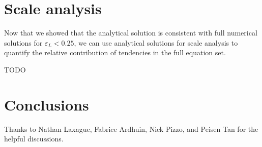 \documentclass[draft]{agujournal2019}
\begin{document}
\section{Scale analysis}
\label{section:scale_analysis}

Now that we showed that the analytical solution is consistent with full numerical
solutions for $\varepsilon_L < 0.25$, we can use analytical solutions for scale
analysis to quantify the relative contribution of tendencies in the full equation set.

TODO

\section{Conclusions}
\label{section:conclusions}

\acknowledgments
Thanks to Nathan Laxague, Fabrice Ardhuin, Nick Pizzo, and Peisen Tan for the
helpful discussions.


\end{document}
